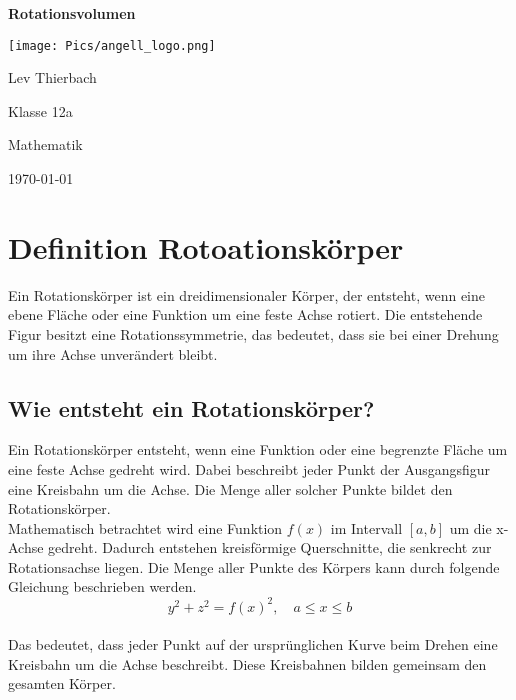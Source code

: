 \documentclass[a4paper,final]{report}
\begin{document}
\begin{titlepage}
  \centering
  \vspace*{2cm}
  {\Huge \bfseries Rotationsvolumen\par}
  \vspace{2cm}
  \texttt{[image: Pics/angell\_logo.png]}\par
  \vspace{2cm}
  {\Large Lev Thierbach\par}
  \vspace{0.5cm}
  {\Large Klasse 12a\par}
  \vspace{0.5cm}
  {\Large Mathematik\par}
  \vfill
  {\large \today\par}
\end{titlepage}


\tableofcontents

\chapter{Definition Rotoationskörper}    

Ein Rotationskörper ist ein dreidimensionaler Körper, der entsteht, wenn eine ebene Fläche oder eine Funktion um eine feste Achse rotiert. Die entstehende Figur besitzt eine Rotationssymmetrie, das bedeutet, dass sie bei einer Drehung um ihre Achse unverändert bleibt.  



\section{Wie entsteht ein Rotationskörper?}

Ein Rotationskörper entsteht, wenn eine Funktion oder eine begrenzte Fläche um eine feste Achse gedreht wird. Dabei beschreibt jeder Punkt der Ausgangsfigur eine Kreisbahn um die Achse. Die Menge aller solcher Punkte bildet den Rotationskörper.
\\
Mathematisch betrachtet wird eine Funktion \( f(x) \) im Intervall \([a, b]\) um die x-Achse gedreht. Dadurch entstehen kreisförmige Querschnitte, die senkrecht zur Rotationsachse liegen. Die Menge aller Punkte des Körpers kann durch folgende Gleichung beschrieben werden. 
\\
\[y^2 + z^2 = f(x)^2, \quad a \leq x \leq b\]
\\
Das bedeutet, dass jeder Punkt auf der ursprünglichen Kurve beim Drehen eine Kreisbahn um die Achse beschreibt. 
Diese Kreisbahnen bilden gemeinsam den gesamten Körper.
\\
\cite{frassek_rotationskoerper}
\cite{studysmarter_rotationskoerper}
\cite{easyschule_rotationskoerper}
\end{document}
